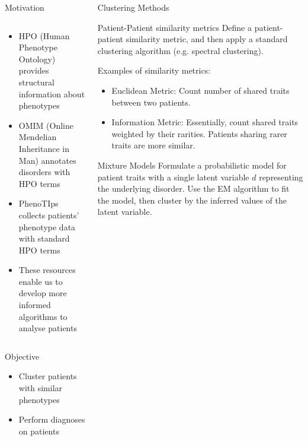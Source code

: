 \documentclass[final]{beamer} %
\begin{document}
\begin{frame}{}
\begin{columns}[T]
\begin{column}{0.3\linewidth}
\begin{block}{\Huge Motivation}
\begin{columns}[T]
      \begin{column}{.5\textwidth}
	    \Large
        \begin{itemize}
          \item
          HPO (Human Phenotype Ontology) provides structural information about phenotypes
          \vspace{2cm}
          \item
          OMIM (Online Mendelian Inheritance in Man) annotates disorders with HPO terms
          \vspace{2cm}
          \item
          PhenoTIps collects patients' phenotype data with standard HPO terms
          \vspace{2cm}
          \item 
          These resources enable us to develop more informed algorithms to analyse patients
      \end{itemize}  
      \vspace{5cm}
      \end{column}
    \end{columns}

    \end{block}
    \begin{block}{\Huge Objective}
     \begin{itemize}
    \Large
     \item
     Cluster patients with similar phenotypes
    \item
    Perform diagnoses on patients
     \end{itemize}
      \end{block}
    \end{column}

    \begin{column}{0.3\linewidth}
     \begin{block}{\Huge Clustering Methods}
     \Large
		\begin{block}{\Large Patient-Patient similarity metrics}
			Define a patient-patient similarity metric, and then apply a standard clustering algorithm (e.g. spectral clustering).

			Examples of similarity metrics:
			\begin{itemize}
				\item Euclidean Metric: Count number of shared traits between two patients.
				\item Information Metric: Essentially, count shared traits weighted by their rarities. Patients sharing rarer traits are more similar.
			\end{itemize}
		\end{block}
		\begin{block}{\Large Mixture Models}
			Formulate a probabilistic model for patient traits with a single latent variable $d$ representing the underlying disorder. Use the EM algorithm to fit the model, then cluster by the inferred values of the latent variable.


\end{block}
\end{block}
\end{column}
\end{columns}
\end{frame}
\end{document}
